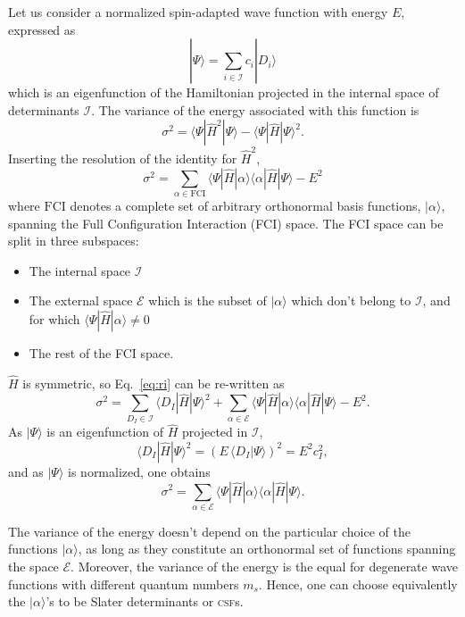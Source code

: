 \documentclass[aip,jcp,reprint,showkeys]{revtex4-1}
\newcommand{\ket}[1]{|#1\rangle}
\newcommand{\csf}{\textsc{csf}}
\newcommand{\mel}[3]{\langle #1 | #2 | #3 \rangle}
\begin{document}
Let us consider a normalized spin-adapted wave function with energy $E$, expressed as
\begin{equation}
\ket{\Psi} = \sum_{i \in \mathcal{I}} c_i \ket{D_i}
\end{equation}
which is an eigenfunction of the Hamiltonian projected in the internal space of
determinants $\mathcal{I}$.
The variance of the energy associated with this function is
\begin{equation}
\sigma^2 = \mel{\Psi}{\hat{H}^2}{\Psi} - \mel{\Psi}{\hat{H}}{\Psi}^2 .
\end{equation}
Inserting the resolution of the identity for $\hat{H}^2$, 
\begin{equation}
\sigma^2 = \sum_{\alpha \in \text{FCI}} \mel{\Psi}{\hat{H}}{\alpha} \mel{\alpha}{\hat{H}}{\Psi} - E^2
\label{eq:ri}
\end{equation}
where $\text{FCI}$ denotes a complete set of arbitrary orthonormal basis
functions, $\ket{\alpha}$, spanning the Full Configuration Interaction (FCI)
space.
The FCI space can be split in three subspaces:
\begin{itemize}
\item The internal space $\mathcal{I}$
\item The external space $\mathcal{E}$ which is the subset of $\ket{\alpha}$ which
      don't belong to $\mathcal{I}$, and for which $\mel{\Psi}{\hat{H}}{\alpha}
      \ne 0$
\item The rest of the FCI space.
\end{itemize}
$\hat{H}$ is symmetric, so Eq.~\eqref{eq:ri} can be re-written as
\begin{equation}
\sigma^2 = \sum_{D_I    \in \mathcal{I}} \mel{D_I}{\hat{H}}{\Psi}^2 
         + \sum_{\alpha \in \mathcal{E}} \mel{\Psi}{\hat{H}}{\alpha} \mel{\alpha}{\hat{H}}{\Psi} - E^2.
\end{equation}
As $\ket{\Psi}$ is an eigenfunction of $\hat{H}$ projected in $\mathcal{I}$, 
\begin{equation}
\mel{D_I}{\hat{H}}{\Psi}^2 = \left( E\, \langle D_I | \Psi \rangle \right)^2 = E^2 c_I^2,
\end{equation}
and as $\ket{\Psi}$ is normalized, one obtains
\begin{equation}
\sigma^2 = \sum_{\alpha \in \mathcal{E}} \mel{\Psi}{\hat{H}}{\alpha}\mel{\alpha}{\hat{H}}{\Psi}.
\end{equation} 

The variance of the energy doesn't depend on the particular choice of the
functions $\ket{\alpha}$, as long as they constitute an orthonormal set of
functions spanning the space $\mathcal{E}$. Moreover, the variance of the
energy is the equal for degenerate wave functions with different quantum
numbers $m_s$.  Hence, one can choose equivalently the $\ket{\alpha}$'s to be
Slater determinants or \csf s.
\end{document}
